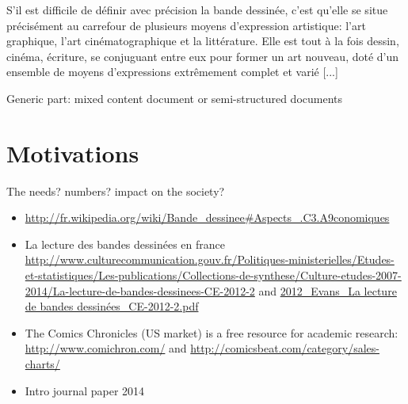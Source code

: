 S'il est difficile de définir avec précision la bande dessinée, c'est qu'elle se situe précisément au carrefour de plusieurs moyens d'expression artistique: l'art graphique, l'art cinématographique et la littérature. Elle est tout à la fois dessin, cinéma, écriture, se conjuguant entre eux pour former un art nouveau, doté d'un ensemble de moyens d'expressions extrêmement complet et varié [...]~\cite{duc1997art}

Generic part: mixed content document or semi-structured documents

\section{Motivations}
The needs? numbers? impact on the society?

\begin{itemize}
	\item \url{http://fr.wikipedia.org/wiki/Bande_dessinee#Aspects_.C3.A9conomiques}
	\item La lecture des bandes dessinées en france \url{http://www.culturecommunication.gouv.fr/Politiques-ministerielles/Etudes-et-statistiques/Les-publications/Collections-de-synthese/Culture-etudes-2007-2014/La-lecture-de-bandes-dessinees-CE-2012-2} and \url{2012_Evans_La lecture de bandes dessinées_CE-2012-2.pdf}
	\item The Comics Chronicles (US market) is a free resource for academic research: \url{http://www.comichron.com/} and \url{http://comicsbeat.com/category/sales-charts/}
	\item Intro journal paper 2014
\end{itemize}

